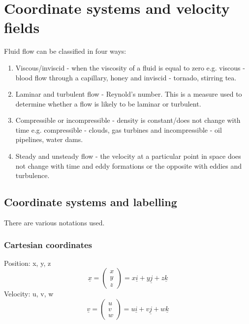 \documentclass[class=report, crop=false, 12pt,a4paper]{standalone}
\begin{document}
\section{Coordinate systems and velocity fields}
Fluid flow can be classified in four ways:
\begin{enumerate}[noitemsep]
  \item Viscous/inviscid - when the viscosity of a fluid is equal to zero e.g. viscous -  blood flow through a capillary, honey and inviscid - tornado, stirring tea.
  \item Laminar and turbulent flow - Reynold's number. This is a measure used to determine whether a flow is likely to be laminar or turbulent.
  \item Compressible or incompressible - density is constant/does not change with time e.g. compressible - clouds, gas turbines and incompressible - oil pipelines, water dams.
  \item Steady and unsteady flow - the velocity at a particular point in space does not change with time and eddy formations or the opposite with eddies and turbulence.
\end{enumerate}
\subsection{Coordinate systems and labelling}
There are various notations used.
\subsubsection{Cartesian coordinates}
Position: x, y, z
\[ \underline{x} = 
\begin{pmatrix}
  x\\
  y\\
  z
\end{pmatrix} = 
x\underline{i} + y\underline{j} + z\underline{k} 
\]
Velocity: u, v, w
\[ \underline{v} = 
\begin{pmatrix}
  u\\
  v\\
  w
\end{pmatrix} = 
u\underline{i} + v\underline{j} + w\underline{k} 
\]
\end{document}
